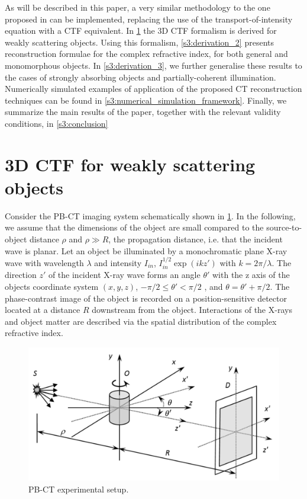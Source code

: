 \documentclass[twocolumn, switch]{article} %
\begin{document}
As will be described in this paper, a very similar methodology to the one proposed in \cite{Thompson2019FastTomography} can be implemented, replacing the use of the transport-of-intensity equation with a CTF equivalent. In \cref{s3:derivation_1} the 3D CTF formalism is derived for weakly scattering objects. Using this formalism, \cref{s3:derivation_2}  presents reconstruction formulae for the complex refractive index, for both general and monomorphous objects. In \cref{s3:derivation_3}, we further generalise these results to the cases of strongly absorbing objects and partially-coherent illumination. Numerically simulated examples of application of the proposed CT reconstruction techniques can be found in \cref{s3:numerical_simulation_framework}. Finally, we summarize the main results of the paper, together with the relevant validity conditions, in \cref{s3:conclusion}

\section{3D CTF for weakly scattering objects} \label{s3:derivation_1}

Consider the PB-CT imaging system schematically shown in \cref{fig3:pbct_experimental_setup_ctf}. In the following, we assume that the dimensions of the object are small compared to the source-to-object distance $\rho$  and $\rho  \gg R$, the propagation distance, i.e. that the incident wave is planar.  Let an object be illuminated by a monochromatic plane X-ray wave with wavelength $\lambda$ and intensity ${I_{in}}$, $I_{in}^{1/2}\exp (ikz')$ with $k = 2\pi /\lambda $.  The direction $z'$ of the incident X-ray wave forms an angle $\theta '$ with the z axis of the objects coordinate system $(x,y,z)$, $ - \pi /2 \le \theta ' < \pi /2$ , and $\theta  = \theta ' + \pi /2$.  The phase-contrast image of the object is recorded on a position-sensitive detector located at a distance $R$ downstream from the object. Interactions of the X-rays and object matter are described via the spatial distribution of the complex refractive index.

\begin{figure}[!htbp]
    \centering
        \includegraphics[width=\linewidth]{pbct_experimental_setup.pdf}%
        \caption{PB-CT experimental setup.}
        \label{fig3:pbct_experimental_setup_ctf}
\end{figure}
\end{document}
